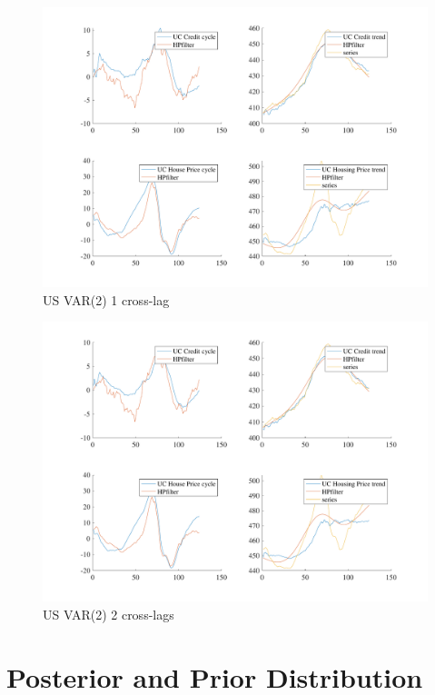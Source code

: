 \documentclass[
  12pt,
]{article}
\begin{document}
\begin{figure}

{\centering \includegraphics[width=0.85\linewidth]{../../Regression/Bayesian_UC_VAR2_nodrift_Crosscycle1lag/OutputData/cycles_US} 

}

\caption{US VAR(2) 1 cross-lag}\label{fig:unnamed-chunk-7}
\end{figure}

\begin{figure}

{\centering \includegraphics[width=0.85\linewidth]{../../Regression/Bayesian_UC_VAR2_nodrift_Crosscycle2lags/OutputData/cycles_US} 

}

\caption{US VAR(2) 2 cross-lags}\label{fig:unnamed-chunk-8}
\end{figure}

\clearpage

\hypertarget{posterior-and-prior-distribution}{%
\section{Posterior and Prior Distribution}\label{posterior-and-prior-distribution}}
\end{document}
